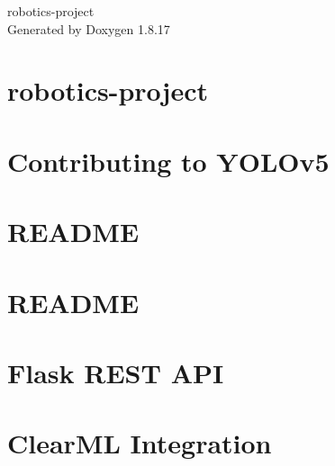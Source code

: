 \let\mypdfximage\pdfximage\def\pdfximage{\immediate\mypdfximage}\documentclass[twoside]{book}
\newcommand{\+}{\discretionary{\mbox{\scriptsize$\hookleftarrow$}}{}{}}
\newcommand{\clearemptydoublepage}{%
  \newpage{\pagestyle{empty}\cleardoublepage}%
}
\begin{document}
\hypersetup{pageanchor=false,
             bookmarksnumbered=true,
             pdfencoding=unicode
            }
\begin{titlepage}
\vspace*{7cm}
\begin{center}%
{\Large robotics-\/project }\\
\vspace*{1cm}
{\large Generated by Doxygen 1.8.17}\\
\end{center}
\end{titlepage}
\clearemptydoublepage
{}
\tableofcontents
\clearemptydoublepage
{}
\hypersetup{pageanchor=true}

\chapter{robotics-\/project}
\label{md_README}

\chapter{Contributing to Y\+O\+L\+Ov5 🚀}
\label{md_vision_yolov5_CONTRIBUTING}

\chapter{R\+E\+A\+D\+ME}
\label{md_vision_yolov5_README}

\chapter{R\+E\+A\+D\+ME}
\label{md_vision_yolov5_README_8zh-CN}

\chapter{Flask R\+E\+ST A\+PI}
\label{md_vision_yolov5_utils_flask_rest_api_README}

\chapter{Clear\+ML Integration}
\label{md_vision_yolov5_utils_loggers_clearml_README}

\end{document}

